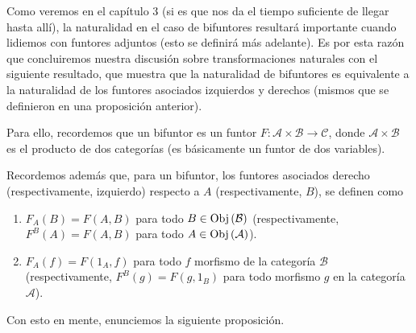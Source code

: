 \documentclass[12pt]{report}
\newcounter{it}
\theoremstyle{largebreak}
\newcommand\cf[3]{\ensuremath{#1:#2\rightarrow#3}}
\newcommand{\Obj}[1]{\ensuremath{\textup{Obj}\left(#1\right)}}
\begin{document}
    Como veremos en el capítulo 3 (si es que nos da el tiempo suficiente de llegar hasta allí), la naturalidad en el caso de bifuntores resultará importante cuando lidiemos con funtores adjuntos (esto se definirá más adelante). Es por esta razón que concluiremos nuestra discusión sobre transformaciones naturales con el siguiente resultado, que muestra que la naturalidad de bifuntores es equivalente a la naturalidad de los funtores asociados izquierdos y derechos (mismos que se definieron en una proposición anterior).

    Para ello, recordemos que un bifuntor es un funtor $\cf{F}{\mathcal{A}\times\mathcal{B}}{\mathcal{C}}$, donde $\mathcal{A}\times\mathcal{B}$ es el producto de dos categorías (es básicamente un funtor de dos variables).

    Recordemos además que, para un bifuntor, los funtores asociados derecho (respectivamente, izquierdo) respecto a $A$ (respectivamente, $B$), se definen como
    \begin{enumerate}
        \item $F_A(B)=F(A,B)$ para todo $B\in\Obj{\mathcal{B}}$ (respectivamente, $F^B(A)=F(A,B)$ para todo $A\in\Obj{\mathcal{A}}$).
        \item $F_A(f)=F(1_A,f)$ para todo $f$ morfismo de la categoría $\mathcal{B}$ (respectivamente, $F^B(g)=F(g,1_B)$ para todo morfismo $g$ en la categoría $\mathcal{A}$).
    \end{enumerate}

    Con esto en mente, enunciemos la siguiente proposición.
\end{document}
